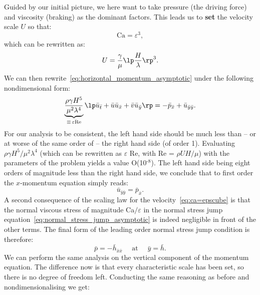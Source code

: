 Guided by our initial picture, we here want to take pressure (the driving force) and viscosity (braking) as the dominant factors. This leads us to \textbf{set} the velocity scale $U$ so that:
\begin{equation}
\text{Ca} = \varepsilon^3,
\label{eq:ca=epscube}
\end{equation}
which can be rewritten as:
\begin{equation}
U = \frac{\gamma}{\mu}\lp\frac{H}{\lambda}\rp^3.
\end{equation}
We can then rewrite~\eqref{eq:horizontal_momentum_asymptotic} under the following nondimensional form:
\begin{equation}
\underbrace{\frac{\rho \gamma H^5}{\mu^2 \lambda^4}}_{\equiv\,\varepsilon\text{Re}}\lp\bar u_{\bar t} + \bar u \bar u_{\bar x} + \bar v \bar u_{\bar y}\rp = -\bar p_{\bar x} + \bar u_{\bar y \bar y}.
\label{eq:horizontal_momentum_asymptotic_nondimensional}
\end{equation}
For our analysis to be consistent, the left hand side should be much less than -- or at worse of the same order of -- the right hand side (of order 1). Evaluating\, ${\rho \gamma H^5}/{\mu^2 \lambda^4}$ (which can be rewritten as $\varepsilon$ Re, with Re = $\rho U H/\mu$) with the parameters of the problem yields a value O(10$^\text{-8}$). The left hand side being eight orders of magnitude less than the right hand side, we conclude that to first order the $x$-momentum equation simply reads:
\begin{equation}
\bar u_{\bar y \bar y} = \bar p_{\bar x}.
\label{eq:horizontal_momentum_asymptotic_nondimensional_leading_order}
\end{equation}
A second consequence of the scaling law for the velocity~\eqref{eq:ca=epscube} is that the normal viscous stress of magnitude Ca$/\varepsilon$ in the normal stress jump equation~\eqref{eq:normal_stress_jump_asymptotic} is indeed negligible in front of the other terms. The final form of the leading order normal stress jump condition is therefore:
\begin{equation}
\bar p = -\bar h_{\bar x \bar x}\quad \text{ at } \quad \bar y = \bar h.
\label{eq:interface_pressure_lubrication}
\end{equation}
 We can perform the same analysis on the vertical component of the momentum equation. The difference now is that every characteristic scale has been set, so there is no degree of freedom left. Conducting the same reasoning as before and nondimensionalising we get:
